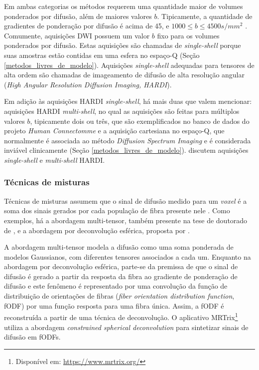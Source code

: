 \documentclass[
    12pt,                %
    oneside,            %
    a4paper,            %
    english,            %
    french,                %
    spanish,            %
    brazil                %
    ]{abntex2}
\begin{document}
Em ambas categorias os métodos requerem uma quantidade maior de volumes ponderados por difusão, além de maiores valores $b$. Tipicamente, a quantidade de gradientes de ponderação por difusão é acima de 45, e $1000 \leq b \leq 4500s/mm^2$ \cite{descoteaux2015}. Comumente, aquisições DWI possuem um valor $b$ fixo para os volumes ponderados por difusão. Estas aquisições são chamadas de \textit{single-shell} porque suas amostras estão contidas em uma esfera no espaço-Q (Seção \ref{metodos_livres_de_modelo}). Aquisições \textit{single-shell} adequadas para tensores de alta ordem são chamadas de imageamento de difusão de alta resolução angular (\textit{High Angular Resolution Diffusion Imaging, HARDI}).

Em adição às aquisições HARDI \textit{single-shell}, há mais duas que valem mencionar: aquisições HARDI \textit{multi-shell}, no qual as aquisições são feitas para múltiplos valores $b$, tipicamente dois ou três, que são exemplificados no banco de dados do projeto \textit{Human Connectomme} \cite{essen2012} e a aquisição cartesiana no espaço-Q, que normalmente é associada ao método \textit{Diffusion Spectrum Imaging} e 
é considerada inviável clinicamente (Seção \ref{metodos_livres_de_modelo}).  discutem aquisições \textit{single-shell} e \textit{multi-shell} HARDI.


\subsubsection{Técnicas de misturas}

Técnicas de misturas assumem que o sinal de difusão medido para um \textit{voxel} é a soma dos sinais gerados por cada população de fibra presente nele \cite{tournier2011}. Como exemplos, há a abordagem multi-tensor, também presente na tese de doutorado de , e a abordagem por deconvolução esférica, proposta por .

A abordagem multi-tensor modela a difusão como uma soma ponderada de modelos Gaussianos, com diferentes tensores associados a cada um. Enquanto na abordagem por deconvolução esférica, parte-se da premissa de que o sinal de difusão é gerado a partir da resposta da fibra ao gradiente de ponderação de difusão e este fenômeno é representado por uma convolução da função de distribuição de orientações de fibras (\textit{fiber orientation distribution function}, fODF) por uma função resposta para uma fibra única. Assim, a fODF é reconstruída a partir de uma técnica de deconvolução. O aplicativo MRTrix\footnote{Disponível em: \url{https://www.mrtrix.org/}} utiliza a abordagem \textit{constrained spherical deconvolution} \cite{tournier2007} para sintetizar sinais de difusão em fODFs.
\end{document}
